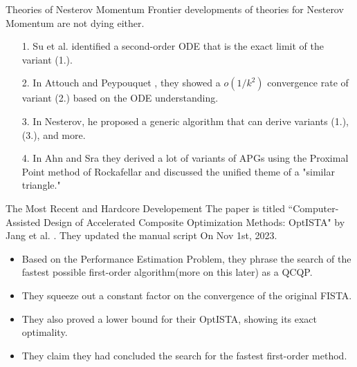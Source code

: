 \documentclass[11pt]{beamer}
\theoremstyle{definition}
\begin{document}
    \begin{frame}{Theories of Nesterov Momentum}
        Frontier developments of theories for Nesterov Momentum are not dying either. 
        \begin{itemize}
            \item [1.] Su et al. \cite{su_differential_2015} identified a second-order ODE that is the exact limit of the variant (1.). 
            \pause
            \item [2.] In Attouch and Peypouquet \cite{attouch_rate_2016}, they showed a $o(1/k^2)$ convergence rate of variant (2.) based on the ODE understanding. 
            \pause
            \item [3.] In Nesterov\cite{nesterov_lecture_2018}, he proposed a generic algorithm that can derive variants (1.), (3.), and more. 
            \pause
            \item [4.] In Ahn and Sra\cite{ahn_understanding_2022}
            they derived a lot of variants of APGs using the Proximal Point method of Rockafellar and discussed the unified theme of a "similar triangle." 
        \end{itemize}
    \end{frame}
    \begin{frame}{The Most Recent and Hardcore Developement}
        The paper is titled ``Computer-Assisted Design of Accelerated Composite Optimization Methods: OptISTA" by Jang et al. \cite{jang_computer-assisted_2023}.
        They updated the manual script On Nov 1st, 2023. 
        \begin{itemize}
            \item Based on the Performance Estimation Problem, they phrase the search of the fastest possible first-order algorithm(more on this later) as a QCQP. 
            \item They squeeze out a constant factor on the convergence of the original FISTA. 
            \item They also proved a lower bound for their OptISTA, showing its exact optimality. 
            \item They claim they had concluded the search for the fastest first-order method. 
        \end{itemize}
    \end{frame}
\end{document}
